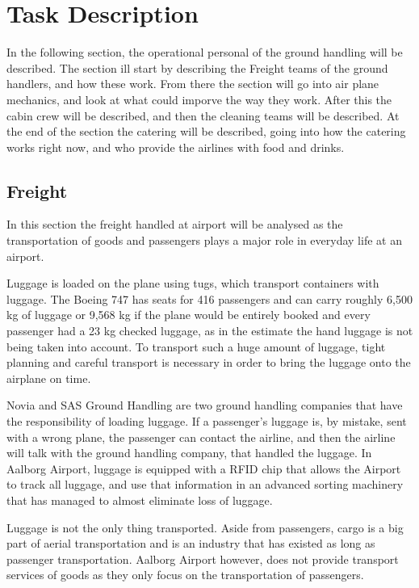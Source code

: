 \section{Task Description}

In the following section, the operational personal of the ground handling will be described. The section ill start by describing the Freight teams of the ground handlers, and how these work. From there the section will go into air plane mechanics, and look at what could imporve the way they work. After this the cabin crew will be described, and then the cleaning teams will be described. At the end of the section the catering will be described, going into how the catering works right now, and who provide the airlines with food and drinks.

\subsection{Freight}
In this section the freight handled at airport will be analysed as the transportation of goods and passengers plays a major role in everyday life at an airport. 

Luggage is loaded on the plane using tugs, which transport containers with luggage. The Boeing 747 has seats for 416 passengers\cite{freight_boing} and can carry roughly 6,500 kg of luggage or 9,568 kg if the plane would be entirely booked and every passenger had a 23 kg checked luggage, as in the estimate the hand luggage is not being taken into account. To transport such a huge amount of luggage, tight planning and careful transport is necessary in order to bring the luggage onto the airplane on time.

Novia and SAS Ground Handling are two ground handling companies that have the responsibility of loading luggage\cite{mistet_bagage}. If a passenger's luggage is, by mistake, sent with a wrong plane, the passenger can contact the airline, and then the airline will talk with the ground handling company, that handled the luggage. In Aalborg Airport, luggage is equipped with a RFID chip that allows the Airport to track all luggage, and use that information in an advanced sorting machinery that has managed to almost eliminate loss of luggage.


Luggage is not the only thing transported. Aside from passengers, cargo is a big part of aerial transportation and is an industry that has existed as long as passenger transportation. Aalborg Airport however, does not provide transport services of goods as they only focus on the transportation of passengers.
%
%


